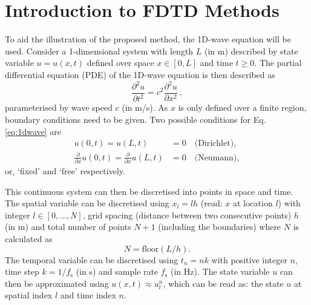 \documentclass[preprint]{JASA}
\begin{document}
\section{\label{sec:2} Introduction to FDTD Methods}
To aid the illustration of the proposed method, the 1D-wave equation will be used. Consider a 1-dimensional system with length $L$ (in m) described by state variable $u = u(x, t)$ defined over space $x \in [0, L]$ and time $t \geq 0$. The partial differential equation (PDE) of the 1D-wave equation is then described as
\begin{equation}\label{eq:1dwave}
    \frac{\partial^2 u}{\partial t^2}= c^2\frac{\partial^2 u}{\partial x^2}\ ,
\end{equation}
parameterised by wave speed $c$ (in m/s). As $x$ is only defined over a finite region, boundary conditions need to be given. Two possible conditions for Eq. \eqref{eq:1dwave} are
\begin{subequations}\label{eq:continuousBoundaries}
    \begin{align}
        u(0, t) = u(L, t) &= 0\quad \text{(Dirichlet)},\\
        \frac{\partial}{\partial x} u(0, t) = \frac{\partial}{\partial x} u(L, t) &= 0\quad \text{(Neumann)},
    \end{align}
\end{subequations}
or, `fixed' and `free' respectively. 

This continuous system can then be discretised into points in space and time. The spatial variable can be discretised using $x_l = lh$ (read: $x$ at location $l$) with integer $l \in [0, \hdots, N]$, grid spacing (distance between two consecutive points) $h$ (in m) and total number of points $N + 1$ (including the boundaries) where $N$ is calculated as 
\begin{equation}\label{eq:numberOfPoints}
    N = \text{floor}(L/h).
\end{equation}
The temporal variable can be discretised using $t_n = nk$ with positive integer $n$, time step $k = 1/f_\text{s}$ (in s) and sample rate $f_\text{s}$ (in Hz). The state variable $u$ can then be approximated using $u(x,t) \approx u_l^n$, which can be read as: the state $u$ at spatial index $l$ and time index $n$.
\end{document}
